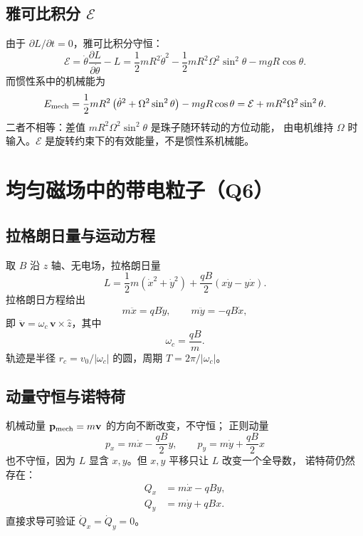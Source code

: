 \documentclass[UTF8,a4paper,11pt]{ctexart}
\begin{document}
\subsection{雅可比积分 $\mathcal E$}

由于 $\partial L/\partial t=0$，雅可比积分守恒：
\begin{equation}
  \mathcal E=\dot\theta\frac{\partial L}{\partial\dot\theta}-L
  =\frac12mR^2\dot\theta^2-\frac12mR^2\Omega^2\sin^2\theta-mgR\cos\theta .
  \label{eq:r-E}
\end{equation}
而惯性系中的机械能为
\begin{equation}
  E_{\rm mech}=\frac12mR^2\left(\dot\theta^2+\Omega^2\sin^2\theta\right)-mgR\cos\theta
  =\mathcal E+mR^2\Omega^2\sin^2\theta .
  \label{eq:r-Emech}
\end{equation}
二者不相等：差值 $mR^2\Omega^2\sin^2\theta$ 是珠子随环转动的方位动能，
由电机维持 $\Omega$ 时输入。$\mathcal E$ 是旋转约束下的有效能量，不是惯性系机械能。

\section{均匀磁场中的带电粒子（Q6）}\label{sec:cyc}

\subsection{拉格朗日量与运动方程}

取 $B$ 沿 $z$ 轴、无电场，拉格朗日量
\begin{equation}
  L=\frac12m\left(\dot x^2+\dot y^2\right)+\frac{qB}{2}\left(x\dot y-y\dot x\right).
  \label{eq:c-L}
\end{equation}
拉格朗日方程给出
\begin{equation}
  m\ddot x=qB\dot y,\qquad m\ddot y=-qB\dot x,
  \label{eq:c-eom}
\end{equation}
即 $\ddot{\mathbf v}=\omega_c\,\mathbf v\times\hat z$，其中
\begin{equation}
  \omega_c=\frac{qB}{m}.
  \label{eq:c-w}
\end{equation}
轨迹是半径 $r_c=v_0/|\omega_c|$ 的圆，周期 $T=2\pi/|\omega_c|$。

\subsection{动量守恒与诺特荷}

机械动量 $\mathbf p_{\rm mech}=m\mathbf v$ 的方向不断改变，不守恒；
正则动量
\begin{equation}
  p_x=m\dot x-\frac{qB}{2}y,\qquad p_y=m\dot y+\frac{qB}{2}x
  \label{eq:c-p}
\end{equation}
也不守恒，因为 $L$ 显含 $x,y$。但 $x,y$ 平移只让 $L$ 改变一个全导数，
诺特荷仍然存在：
\begin{align}
  Q_x&=m\dot x-qBy, \label{eq:c-Qx}\\
  Q_y&=m\dot y+qBx. \label{eq:c-Qy}
\end{align}
直接求导可验证 $\dot Q_x=\dot Q_y=0$。
\end{document}
